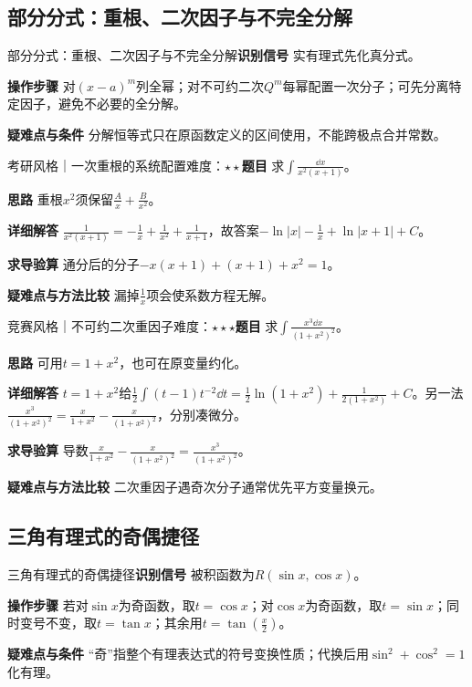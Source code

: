 \subsection{部分分式：重根、二次因子与不完全分解}\label{ic:indefinite_classical_complete:partial}\begin{method}{部分分式：重根、二次因子与不完全分解}\textbf{识别信号} 实有理式先化真分式。\par \textbf{操作步骤} 对$(x-a)^m$列全幂；对不可约二次$Q^m$每幂配置一次分子；可先分离特定因子，避免不必要的全分解。\par \textbf{疑难点与条件} 分解恒等式只在原函数定义的区间使用，不能跨极点合并常数。\end{method}

\begin{example}{考研风格｜一次重根的系统配置}{难度：$\star\star$}\label{ic:ex:indefinite_classical_complete:repeated}\textbf{题目} 求$\int\frac{\dd x}{x^2(x+1)}$。\par \textbf{思路} 重根$x^2$须保留$\frac{A}{x}+\frac{B}{x^2}$。\par \textbf{详细解答} $\frac{1}{x^2(x+1)}=-\frac{1}{x}+\frac{1}{x^2}+\frac{1}{x+1}$，故答案$-\ln|x|-\frac{1}{x}+\ln|x+1|+C$。\par \textbf{求导验算} 通分后的分子$-x(x+1)+(x+1)+x^2=1$。\par \textbf{疑难点与方法比较} 漏掉$\frac{1}{x}$项会使系数方程无解。\end{example}

\begin{example}{竞赛风格｜不可约二次重因子}{难度：$\star\star\star$}\label{ic:ex:indefinite_classical_complete:quadraticrepeated}\textbf{题目} 求$\int \frac{x^3\dd x}{(1+x^2)^2}$。\par \textbf{思路} 可用$t=1+x^2$，也可在原变量约化。\par \textbf{详细解答} $t=1+x^2$给$\frac12\int(t-1)t^{-2}\dd t=\frac12\ln(1+x^2)+\frac1{2(1+x^2)}+C$。另一法$\frac{x^3}{(1+x^2)^2}=\frac{x}{1+x^2}-\frac{x}{(1+x^2)^2}$，分别凑微分。\par \textbf{求导验算} 导数$\frac{x}{1+x^2}-\frac{x}{(1+x^2)^2}=\frac{x^3}{(1+x^2)^2}$。\par \textbf{疑难点与方法比较} 二次重因子遇奇次分子通常优先平方变量换元。\end{example}

\subsection{三角有理式的奇偶捷径}\label{ic:indefinite_classical_complete:trigparity}\begin{method}{三角有理式的奇偶捷径}\textbf{识别信号} 被积函数为$R(\sin x,\cos x)$。\par \textbf{操作步骤} 若对$\sin x$为奇函数，取$t=\cos x$；对$\cos x$为奇函数，取$t=\sin x$；同时变号不变，取$t=\tan x$；其余用$t=\tan(\frac{x}{2})$。\par \textbf{疑难点与条件} “奇”指整个有理表达式的符号变换性质；代换后用$\sin^2+\cos^2=1$化有理。\end{method}

